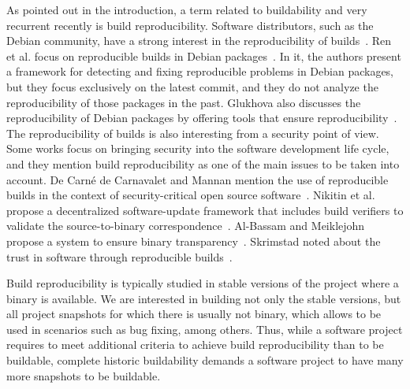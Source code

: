 As pointed out in the introduction, a term related to buildability and very recurrent recently is build reproducibility.
Software distributors, such as the Debian community, have a strong interest in the reproducibility of builds~\cite{RepBlds:2017:Online,RepBldsDebian:2018:Online}.
Ren et al. focus on reproducible builds in Debian packages~\cite{Ren:2018:ALU:3180155.3180224}.
In it, the authors present a framework for detecting and fixing reproducible problems in Debian packages, but they focus exclusively on the latest commit, and they do not analyze the reproducibility of those packages in the past.
Glukhova also discusses the reproducibility of Debian packages by offering tools that ensure reproducibility~\cite{Glukhova:Thesis:2017}.
The reproducibility of builds is also interesting from a security point of view.
Some works focus on bringing security into the software development life cycle, and they mention build reproducibility as one of the main issues to be taken into account.
De Carn\'e de Carnavalet and Mannan mention the use of reproducible builds in the context of security-critical open source software~\cite{deCarnedeCarnavalet:2014:CIV:2664243.2664288}.
Nikitin et al. propose a decentralized software-update framework that includes build verifiers to validate the source-to-binary correspondence~\cite{nikitin2017chainiac}.
Al-Bassam and Meiklejohn propose a system to ensure binary transparency~\cite{10.1007/978-3-030-00305-0_8}.
Skrimstad noted about the trust in software through reproducible builds~\cite{Skrimstad:Thesis:2018}.

Build reproducibility is typically studied in stable versions of the project where a binary is available.
We are interested in building not only the stable versions, but all project snapshots for which there is usually not binary, which allows to be used in scenarios such as bug fixing, among others.
Thus, while a software project requires to meet additional criteria to achieve build reproducibility than to be buildable, complete historic buildability demands a software project to have many more snapshots to be buildable.






